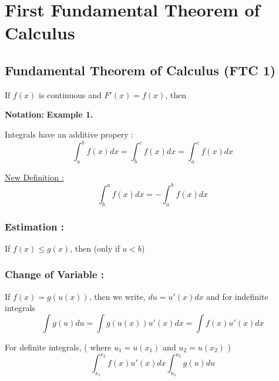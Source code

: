 

\chapter{First Fundamental Theorem of Calculus}
\bigbreak

\section{Fundamental Theorem of Calculus (FTC 1)}

\begin{mdframed}
\begin{center}
	If $f(x)$ is continuous and $F'(x) = f(x)$, then \\
\end{center}
\end{mdframed}

{\bf Notation: } 
\bigbreak
{\bf Example 1.}  
\bigbreak

Integrals have an additive propery : 
$$
	\int_a^b f(x) dx = \int_b^c f(x) dx = \int_a^c f(x) dx
$$

\underline{New Definition : }
$$
	\int_b^a f(x) dx = - \int_a^b f(x) dx
$$


\subsection{Estimation : }
If $f(x) \leq g(x)$, then  (only if $a < b$)

\subsection{Change of Variable : }
If $f(x) = g(u(x))$, then we write, $du = u'(x)dx$ and for indefinite integrals
$$ \int g(u) du = \int g(u(x)) u'(x) dx = \int f(x)u'(x)dx $$

For definite integrals, ( where $u_1 = u(x_1)$ and $u_2 = u(x_2)$ ) 
$$ \int_{x_1}^{x_2} f(x)u'(x)dx \int_{u_1}^{u_2} g(u) du $$

